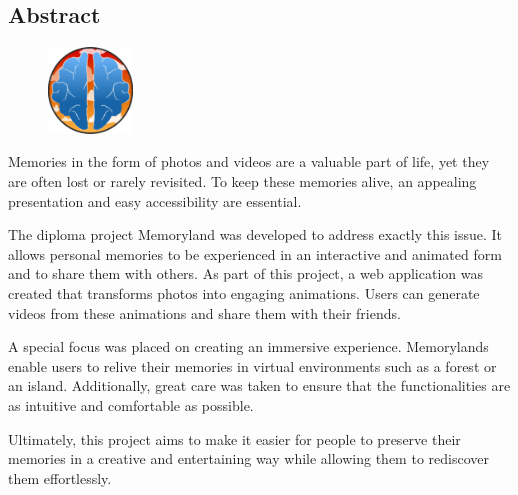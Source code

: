 \begin{spacing}{1}
    \chapter*{Abstract}
\end{spacing}
\begin{figure}
    \begin{center}
      \includegraphics[width=0.2\textwidth]{pics/memoryland-logo.png}
    \end{center}
\end{figure}

Memories in the form of photos and videos are a valuable part of life, yet they are often 
lost or rarely revisited. To keep these memories alive, an appealing presentation and easy 
accessibility are essential.

The diploma project Memoryland was developed to address exactly this issue. It allows 
personal memories to be experienced in an interactive and animated form and to share them with 
others. As part of this project, a web application was created that transforms photos into 
engaging animations. Users can generate videos from these animations and share them with 
their friends.

A special focus was placed on creating an immersive experience. Memorylands enable 
users to relive their memories in virtual environments such as a forest or an island. 
Additionally, great care was taken to ensure that the functionalities are as intuitive
and comfortable as possible.

Ultimately, this project aims to make it easier for people to preserve their memories 
in a creative and entertaining way while allowing them to rediscover them effortlessly.

